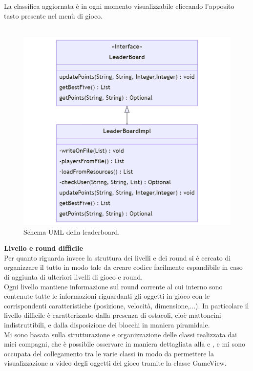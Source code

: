 \documentclass[a4paper,12pt]{report}
\begin{document}
La classifica aggiornata è in ogni momento visualizzabile cliccando l'apposito tasto presente nel menù di gioco.\\\\
\begin{figure}[H]
    \centering{}
    \includegraphics[scale=0.4]{images/leaderboard.png}
    \caption{Schema UML della leaderboard.}
    \label{images:leaderboard}
\end{figure}

\textbf{Livello e round difficile}\\
Per quanto riguarda invece la struttura dei livelli e dei round si è cercato di organizzare il tutto in modo tale da creare codice facilmente espandibile in caso di aggiunta di ulteriori livelli di gioco e round.
\\Ogni livello mantiene informazione sul round corrente al cui interno sono contenute tutte le informazioni riguardanti gli oggetti in gioco con le corrispondenti caratteristiche (posizione, velocità, dimensione,...).
In particolare il livello difficile è caratterizzato dalla presenza di ostacoli, cioè mattoncini indistruttibili, e dalla disposizione dei blocchi in maniera piramidale.
\\Mi sono basata sulla strutturazione e organizzazione delle classi realizzata dai miei compagni, che è possibile osservare in maniera dettagliata alla  e , e mi sono occupata del collegamento tra le varie classi in modo da permettere la visualizzazione a video degli oggetti del gioco tramite la classe GameView.\\\\
\end{document}
